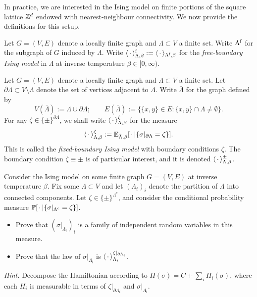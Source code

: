 In practice, we are interested in the Ising model on finite portions of the square
lattice $\mathbb Z^d$ endowed with nearest-neighbour connectivity.
We now provide the definitions for this setup.

\begin{definition}
    Let $G=(V,E)$ denote a locally finite graph and $\Lambda\subset V$ a finite set.
    Write $\Lambda^{\operatorname{f}}$ for the subgraph of $G$ induced by $\Lambda$.
    Write $\langle\,\cdot\,\rangle_{\Lambda,\beta}^{\operatorname{f}}:=\langle\,\cdot\,\rangle_{\Lambda^{\operatorname{f}},\beta}$ for the \emph{free-boundary
    Ising model} in $\Lambda$ at inverse temperature $\beta\in[0,\infty)$.    
\end{definition}

\begin{definition}
    Let $G=(V,E)$ denote a locally finite graph and $\Lambda\subset V$ a finite set.
    Let $\partial\Lambda\subset V\setminus\Lambda$ denote the set of vertices adjacent to $\Lambda$.
    Write $\bar\Lambda$ for the graph defined by
    \[
        V(\bar\Lambda):=\Lambda\cup\partial\Lambda;\qquad
        E(\bar\Lambda):=\{\{x,y\}\in E:\{x,y\}\cap\Lambda\neq\emptyset\}.
    \]
    For any $\zeta\in\{\pm\}^{\partial\Lambda}$,
    we shall write $\langle\,\cdot\,\rangle_{\Lambda,\beta}^\zeta$
    for the measure
    \[
        \langle\,\cdot\,\rangle_{\Lambda,\beta}^\zeta:=\mathbb E_{\bar\Lambda,\beta}[\,\cdot\,|\{\sigma|_{\partial\Lambda}=\zeta\}].
    \]
    This is called the \emph{fixed-boundary Ising model} with boundary conditions $\zeta$.
    The boundary condition $\zeta\equiv\pm$ is of particular interest,
    and it is denoted $\langle\,\cdot\,\rangle_{\Lambda,\beta}^\pm$.
\end{definition}

\begin{exercise}
    Consider the Ising model on some finite graph $G=(V,E)$ at inverse temperature $\beta$.
    Fix some $\Lambda\subset V$ and let $(\Lambda_i)_i$ denote the partition of $\Lambda$ into connected components.
    Let $\zeta\in\{\pm\}^{\Lambda^c}$,
    and consider the conditional probability measure
    $\mathbb P[\,\cdot\,|\{\sigma|_{\Lambda^c}=\zeta\}]$.
    \begin{itemize}
        \item Prove that $(\sigma|_{\Lambda_i})_i$ is a family of independent random variables in this measure.
        \item Prove that the law of $\sigma|_{\Lambda_i}$ is $\langle\,\cdot\,\rangle_{\Lambda_i}^{\zeta|_{\partial\Lambda_i}}$.
    \end{itemize}
    \emph{Hint.}
    Decompose the Hamiltonian according to $H(\sigma)=C+\sum_i H_i(\sigma)$,
    where each $H_i$ is measurable in terms of $\zeta|_{\partial\Lambda_i}$ and $\sigma|_{\Lambda_i}$.
\end{exercise}

